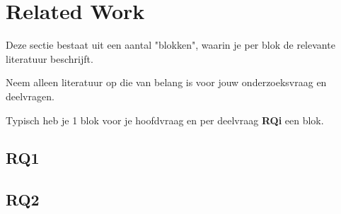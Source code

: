 \section{Related Work}
\label{sec:rel}

Deze sectie bestaat uit een aantal "blokken", waarin je per blok de relevante literatuur beschrijft. 

Neem alleen literatuur op die van belang is voor jouw onderzoeksvraag en deelvragen.

Typisch heb je 1 blok voor je hoofdvraag en per deelvraag \textbf{RQi} een blok. 


\subsection{RQ1}

\subsection{RQ2}